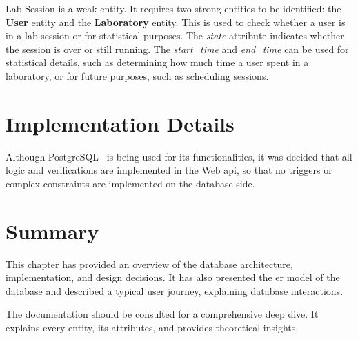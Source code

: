 Lab Session is a weak entity. It requires two strong entities to be identified: the \textbf{User} entity and the \textbf{Laboratory} entity. This is used to check whether a user is in a lab session or for statistical purposes. The \textit{state} attribute indicates whether the session is over or still running. The \textit{start\_time} and \textit{end\_time} can be used for statistical details, such as determining how much time a user spent in a laboratory, or for future purposes, such as scheduling sessions.

\section{Implementation Details}
Although PostgreSQL~\cite{postgresql} is being used for its functionalities, it was decided that all logic and verifications are implemented in the Web \ac{api}, so that no triggers or complex constraints are implemented on the database side.

\section{Summary}
This chapter has provided an overview of the database architecture, implementation, and design decisions. It has also presented the \acs{er model} of the database and described a typical user journey, explaining database interactions.

The documentation should be consulted for a comprehensive deep dive. It explains every entity, its attributes, and provides theoretical insights.